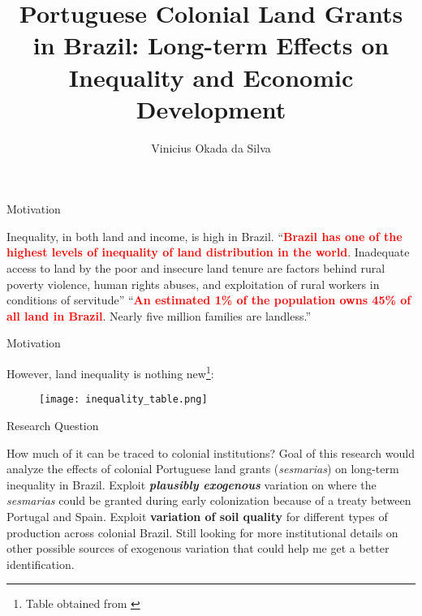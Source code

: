 \documentclass[aspectratio=1610]{beamer}
\title{Portuguese Colonial Land Grants in Brazil: Long-term Effects on Inequality and Economic Development}
\author{Vinicius Okada da Silva}
\institute{The University of Illinois at Urbana-Champaign}
\date{}
\begin{document}
\begin{frame}
	\titlepage
\end{frame}

\begin{frame}{Motivation}
    \begin{outline}
        \1 Inequality, in both land and income, is high in Brazil.
            \vspace{1mm}
            \2 ``\textcolor{red}{\textbf{Brazil has one of the highest levels of inequality of land distribution in the world}}. Inadequate access to land by the poor and insecure land tenure are factors behind rural poverty violence, human rights abuses, and exploitation of rural workers in conditions of servitude'' \parencite{Usaid2016-xs}
            \vspace{1mm}
            \2 ``\textcolor{red}{\textbf{An estimated 1\% of the population owns 45\% of all land in Brazil}}. Nearly five million families are landless.'' \parencite{Usaid2016-xs}
    \end{outline}
\end{frame}

\begin{frame}{Motivation}
    \begin{outline}
        \1 However, land inequality is nothing new\footnote[frame,1]{Table obtained from \textcite{Alston2010-cn}}:
    \end{outline}

    \begin{figure}
        \centering
        \texttt{[image: inequality\_table.png]}
    \end{figure}
\end{frame}


\begin{frame}{Research Question}
    \begin{outline}
        \1 How much of it can be traced to colonial institutions?
            \vspace{1mm}
            \2 Goal of this research would analyze the effects of colonial Portuguese land grants (\textit{sesmarias}) on long-term inequality in Brazil.
            \vspace{1mm}
            \2 Exploit \textbf{\textit{plausibly exogenous}} variation on where the \textit{sesmarias} could be granted during early colonization because of a treaty between Portugal and Spain. 
            \2 Exploit \textbf{variation of soil quality} for different types of production across colonial Brazil.
            \vspace{1mm}
            \2 Still looking for more institutional details on other possible sources of exogenous variation that could help me get a better identification.
    \end{outline}
\end{frame}
\end{document}
